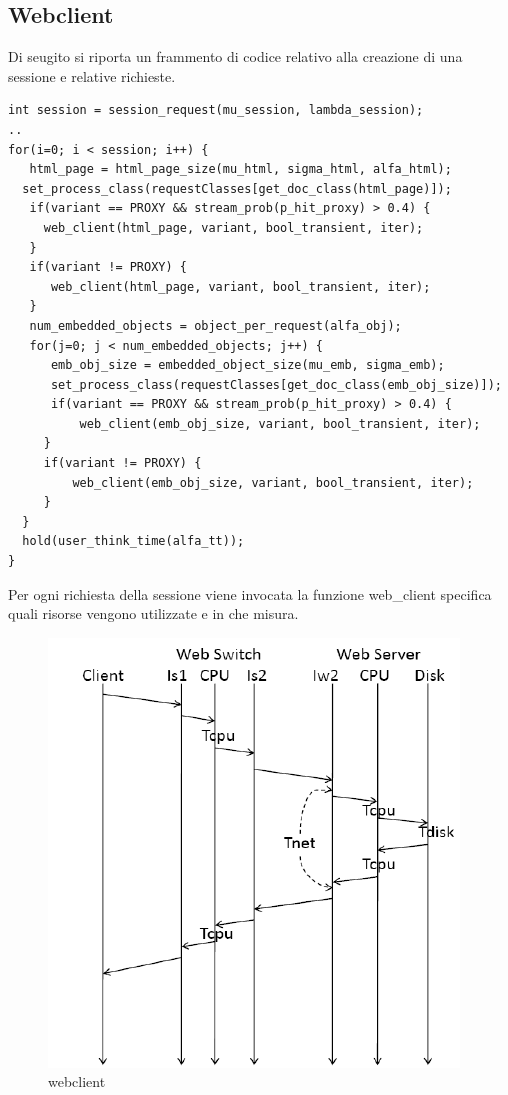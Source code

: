 \subsection{Webclient}
Di seugito si riporta un frammento di codice relativo alla creazione di una sessione e relative richieste. 
\begin{lstlisting}
int session = session_request(mu_session, lambda_session); 
..
for(i=0; i < session; i++) { 
   html_page = html_page_size(mu_html, sigma_html, alfa_html); 
  set_process_class(requestClasses[get_doc_class(html_page)]); 
   if(variant == PROXY && stream_prob(p_hit_proxy) > 0.4) { 
     web_client(html_page, variant, bool_transient, iter); 
   } 
   if(variant != PROXY) { 
      web_client(html_page, variant, bool_transient, iter); 
   } 
   num_embedded_objects = object_per_request(alfa_obj); 
   for(j=0; j < num_embedded_objects; j++) { 
      emb_obj_size = embedded_object_size(mu_emb, sigma_emb); 
      set_process_class(requestClasses[get_doc_class(emb_obj_size)]); 
      if(variant == PROXY && stream_prob(p_hit_proxy) > 0.4) { 
          web_client(emb_obj_size, variant, bool_transient, iter); 
     } 
     if(variant != PROXY) { 
         web_client(emb_obj_size, variant, bool_transient, iter); 
     } 
  } 
  hold(user_think_time(alfa_tt));
}
\end{lstlisting}
Per ogni richiesta della sessione viene invocata la funzione web\_client specifica quali risorse vengono utilizzate e in che misura. 
\begin{figure}[H]
\begin{center}
\includegraphics[scale=0.5]{etc/webclient.png}
\caption{webclient}
\label{webclient}
\end{center}
\end{figure}
